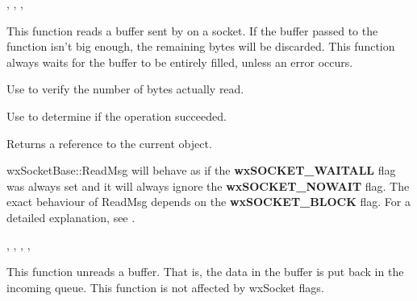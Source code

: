 
, 
, 
, 

%
%
\label{wxsocketbasereadmsg}


This function reads a buffer sent by  
on a socket. If the buffer passed to the function isn't big enough, the
remaining bytes will be discarded. This function always waits for the
buffer to be entirely filled, unless an error occurs.

Use  to verify the number of bytes actually read.

Use  to determine if the operation succeeded.





Returns a reference to the current object.


wxSocketBase::ReadMsg will behave as if the {\bf wxSOCKET\_WAITALL} flag
was always set and it will always ignore the {\bf wxSOCKET\_NOWAIT} flag.
The exact behaviour of ReadMsg depends on the {\bf wxSOCKET\_BLOCK} flag.
For a detailed explanation, see .


, 
, 
, 
, 

%
%
\label{wxsocketbaseunread}


This function unreads a buffer. That is, the data in the buffer is put back
in the incoming queue. This function is not affected by wxSocket flags.

